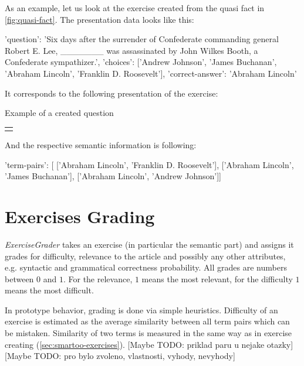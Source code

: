 \documentclass[a4paper, 12pt, twoside]{fithesis2}		%
\renewcommand{\_}{\leavevmode \kern0.07em\vbox{\hrule width0.4em}}
\newcounter{choice}
\renewcommand\thechoice{\Alph{choice}}
\newcommand\choicelabel{\thechoice.}
\newenvironment{choices}%
  {\vspace{0.8em}\list{\choicelabel}%
     {\usecounter{choice}\def\makelabel##1{\hss\llap{##1}}%
       \settowidth{\leftmargin}{W.\hskip\labelsep\hskip 0.01em}%
       \def\choice{%
         \item
       } %
       \labelwidth\leftmargin\advance\labelwidth-\labelsep
       \topsep=0pt
       \partopsep=0pt
     }%
  }%
  {\vspace{-0.7em}\endlist}
\newenvironment{question}
{
  \begin{center}
  \begin{tabular}{p{0.9\textwidth}}
  \vskip 0.05em
}
{
  \\
  \end{tabular}
  \end{center}
}
\newcommand{\sentenceGap}{\rule{1.5cm}{0.4pt}~}
\begin{document}
As an example, let us look at the exercise created from the quasi fact in \autoref{fig:quasi-fact}. The presentation data looks like this:
\begin{code}
{'question': 'Six days after the surrender of Confederate commanding
              general Robert E. Lee, _______ was assassinated by
              John Wilkes Booth, a Confederate sympathizer.',
'choices': ['Andrew Johnson', 'James Buchanan',
            'Abraham Lincoln', 'Franklin D. Roosevelt'],
'correct-answer': 'Abraham Lincoln'}
\end{code}
It corresponds to the following presentation of the exercise:
\begin{exercise}
\label{exrc:assassination}
\caption{Example of a created question}
  \begin{question}
  Six days after the surrender of Confederate commanding general Robert E. Lee
  \sentenceGap
  was assassinated by John Wilkes Booth, a Confederate sympathizer.

  \begin{choices}
    \choice Andrew Johnson
    \choice James Buchanan
    \choice Abraham Lincoln
    \choice Franklin D. Roosevelt
  \end{choices}
  \end{question}
\end{exercise}

And the respective semantic information is following:
\begin{code}
{'term-pairs': [
    ['Abraham Lincoln', 'Franklin D. Roosevelt'],
    ['Abraham Lincoln', 'James Buchanan'],
    ['Abraham Lincoln', 'Andrew Johnson']]}
\end{code}

\section{Exercises Grading}
\label{sec:smartoo-exercises-grading}

\textit{ExerciseGrader} takes an exercise (in particular the semantic part) and assigns it grades for difficulty, relevance to the article and possibly any other attributes, e.g. syntactic and grammatical correctness probability. All grades are numbers between $0$ and $1$. For the relevance, $1$ means the most relevant, for the difficulty $1$ means the most difficult.

In prototype behavior, grading is done via simple heuristics.
Difficulty of an exercise is estimated as the average similarity between all term pairs which can be mistaken.
Similarity of two terms is measured in the same way as in exercise creating (\autoref{sec:smartoo-exercises}).
[Maybe TODO: priklad paru u nejake otazky] [Maybe TODO: pro bylo zvoleno, vlastnosti, vyhody, nevyhody]
\end{document}
